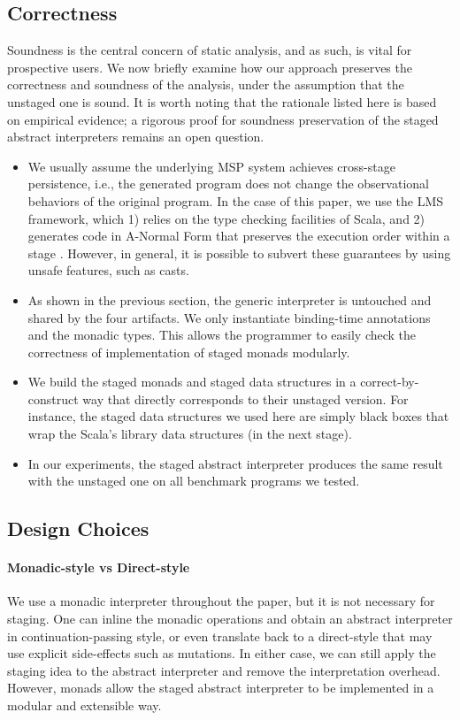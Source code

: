 \subsection{Correctness}

Soundness is the central concern of static analysis, and as such, is vital
for prospective users. We now briefly examine how our
approach preserves the correctness and soundness of the analysis, under the
assumption that the unstaged one is sound. It is worth noting that the rationale
listed here is based on empirical evidence; a rigorous proof for soundness
preservation of the staged abstract interpreters remains an open question.

\begin{itemize}
  \item We usually assume the underlying MSP system achieves cross-stage
    persistence, i.e., the generated program does not change the observational
    behaviors of the original program. In the case of this paper, we use the
    LMS framework, which 1) relies on the type checking facilities of Scala, and
    2) generates code in A-Normal Form \cite{Flanagan:1993:ECC:155090.155113}
    that preserves the execution order within a stage \cite{DBLP:conf/birthday/Rompf16}.
    However, in general, it is possible to subvert these guarantees by
    using unsafe features, such as casts.
  \item As shown in the previous section, the generic interpreter is untouched
    and shared by the four artifacts. We only instantiate binding-time
    annotations and the monadic types. This allows the programmer to easily
    check the correctness of implementation of staged monads modularly.
  \item We build the staged monads and staged data structures in a
    correct-by-construct way that directly corresponds to their unstaged
    version. For instance, the staged data structures we used here are simply
    black boxes that wrap the Scala's library data structures (in the next
    stage).
  \item In our experiments, the staged abstract interpreter produces the same
    result with the unstaged one on all benchmark programs we tested.
\end{itemize}

\subsection{Design Choices}

\paragraph{Monadic-style vs Direct-style} We use a monadic interpreter throughout the paper,
but it is not necessary for staging. One can inline the monadic
operations and obtain an abstract interpreter in continuation-passing
style, or even translate back to a direct-style that may use explicit
side-effects such as mutations. In either case, we can still apply the
staging idea to the abstract interpreter and remove the interpretation
overhead. However, monads allow the staged abstract interpreter to be
implemented in a modular and extensible way.


